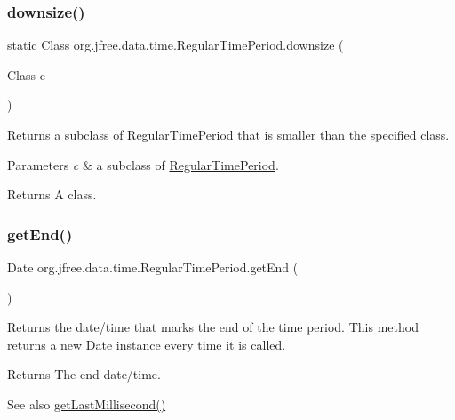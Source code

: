 \subsubsection{\texorpdfstring{downsize()}{downsize()}}
{\footnotesize\ttfamily static Class org.\+jfree.\+data.\+time.\+Regular\+Time\+Period.\+downsize (\begin{DoxyParamCaption}\item[{Class}]{c }\end{DoxyParamCaption})\hspace{0.3cm}{\ttfamily [static]}}

Returns a subclass of \mbox{\hyperlink{classorg_1_1jfree_1_1data_1_1time_1_1_regular_time_period}{Regular\+Time\+Period}} that is smaller than the specified class.


\begin{DoxyParams}{Parameters}
{\em c} & a subclass of \mbox{\hyperlink{classorg_1_1jfree_1_1data_1_1time_1_1_regular_time_period}{Regular\+Time\+Period}}.\\
\hline
\end{DoxyParams}
\begin{DoxyReturn}{Returns}
A class. 
\end{DoxyReturn}
\mbox{\label{classorg_1_1jfree_1_1data_1_1time_1_1_regular_time_period_a90dca860a17fffbbacbe0d2ddeb721fe}} 
\subsubsection{\texorpdfstring{get\+End()}{getEnd()}}
{\footnotesize\ttfamily Date org.\+jfree.\+data.\+time.\+Regular\+Time\+Period.\+get\+End (\begin{DoxyParamCaption}{ }\end{DoxyParamCaption})}

Returns the date/time that marks the end of the time period. This method returns a new {\ttfamily Date} instance every time it is called.

\begin{DoxyReturn}{Returns}
The end date/time.
\end{DoxyReturn}
\begin{DoxySeeAlso}{See also}
\mbox{\hyperlink{classorg_1_1jfree_1_1data_1_1time_1_1_regular_time_period_ab5ad818ae1c90ec6efd57304594e6801}{get\+Last\+Millisecond()}} 
\end{DoxySeeAlso}


